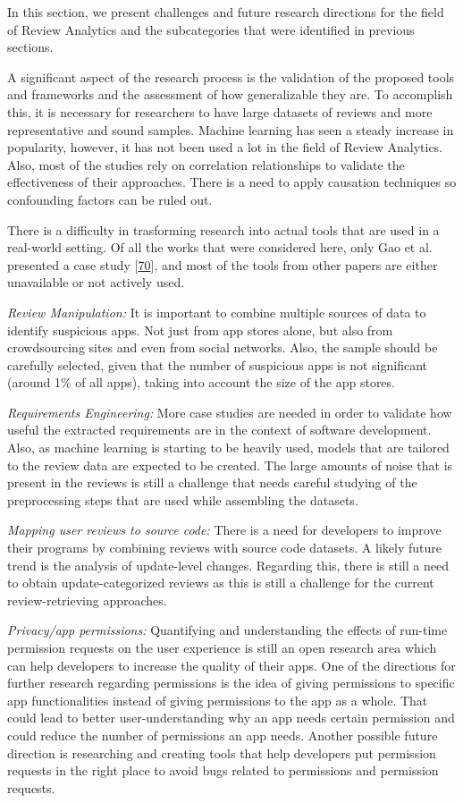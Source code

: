 \documentclass[]{book}
\begin{document}
In this section, we present challenges and future research directions
for the field of Review Analytics and the subcategories that were
identified in previous sections.

A significant aspect of the research process is the validation of the
proposed tools and frameworks and the assessment of how generalizable
they are. To accomplish this, it is necessary for researchers to have
large datasets of reviews and more representative and sound samples.
Machine learning has seen a steady increase in popularity, however, it
has not been used a lot in the field of Review Analytics. Also, most of
the studies rely on correlation relationships to validate the
effectiveness of their approaches. There is a need to apply causation
techniques so confounding factors can be ruled out.

There is a difficulty in trasforming research into actual tools that are
used in a real-world setting. Of all the works that were considered
here, only Gao et al. presented a case study
{[}\protect\hyperlink{ref-gao2018online}{70}{]}, and most of the tools
from other papers are either unavailable or not actively used.

\emph{Review Manipulation:} It is important to combine multiple sources
of data to identify suspicious apps. Not just from app stores alone, but
also from crowdsourcing sites and even from social networks. Also, the
sample should be carefully selected, given that the number of suspicious
apps is not significant (around 1\% of all apps), taking into account
the size of the app stores.

\emph{Requirements Engineering:} More case studies are needed in order
to validate how useful the extracted requirements are in the context of
software development. Also, as machine learning is starting to be
heavily used, models that are tailored to the review data are expected
to be created. The large amounts of noise that is present in the reviews
is still a challenge that needs careful studying of the preprocessing
steps that are used while assembling the datasets.

\emph{Mapping user reviews to source code:} There is a need for
developers to improve their programs by combining reviews with source
code datasets. A likely future trend is the analysis of update-level
changes. Regarding this, there is still a need to obtain
update-categorized reviews as this is still a challenge for the current
review-retrieving approaches.

\emph{Privacy/app permissions:} Quantifying and understanding the
effects of run-time permission requests on the user experience is still
an open research area which can help developers to increase the quality
of their apps. One of the directions for further research regarding
permissions is the idea of giving permissions to specific app
functionalities instead of giving permissions to the app as a whole.
That could lead to better user-understanding why an app needs certain
permission and could reduce the number of permissions an app needs.
Another possible future direction is researching and creating tools that
help developers put permission requests in the right place to avoid bugs
related to permissions and permission requests.
\end{document}
